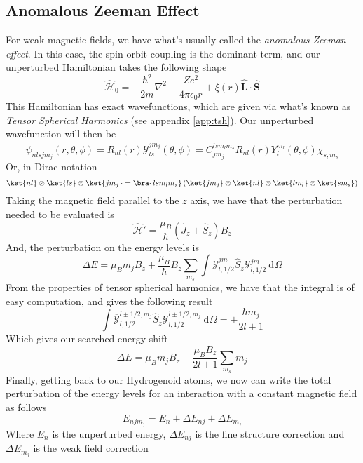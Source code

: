\documentclass[a4paper, 11pt]{book}
\renewcommand{\vec}[1]{\mathbf{#1}}
\newcommand{\1}{\opr{\mathds{1}}}
\newcommand{\diff}[2][]{\ \mathrm{d}^{#1}#2}
\newcommand{\ham}{\mathcal{H}}
\newcommand{\opr}[1]{\hat{#1}}
\newcommand{\cc}[1]{\overline{#1}}
\newcommand{\mc}[1]{\mathcal{#1}}
\newcommand{\vecopr}[1]{\opr{\vec{#1}}}
\theoremstyle{plain}
\begin{document}
	\subsection{Anomalous Zeeman Effect}
	For weak magnetic fields, we have what's usually called the \textit{anomalous Zeeman effect}. In this case, the spin-orbit coupling is the dominant term, and our unperturbed Hamiltonian takes the following shape
	\begin{equation}
		\opr{\ham}_0=-\frac{\hbar^2}{2m}\nabla^2-\frac{Ze^2}{4\pi\epsilon_0r}+\xi(r)\vecopr{L}\cdot\vecopr{S}
		\label{eq:spinorbitham}
	\end{equation}
	This Hamiltonian has exact wavefunctions, which are given via what's known as \textit{Tensor Spherical Harmonics} (see appendix \ref{app:tsh}). Our unperturbed wavefunction will then be
	\begin{equation}
		\psi_{nlsjm_j}(r,\theta,\phi)=R_{nl}(r)\mc{Y}^{jm_j}_{ls}(\theta,\phi)=C_{jm_j}^{lsm_lm_s}R_{nl}(r)Y^{m_l}_l(\theta,\phi)\chi_{s,m_s}
		\label{eq:wavefunctionspinorbit}
	\end{equation}
	Or, in Dirac notation
	\begin{equation}
		\ket{nl}\otimes\ket{ls}\otimes\ket{jm_j}=\bra{lsm_lm_s}\left(\ket{jm_j}\otimes\ket{nl}\otimes\ket{lm_l}\otimes\ket{sm_s}\right)
		\label{eq:spinorbitautoket}
	\end{equation}
	Taking the magnetic field parallel to the $z$ axis, we have that the perturbation needed to be evaluated is
	\begin{equation}
		\opr{\ham}'=\frac{\mu_B}{\hbar}\left( \opr{J}_z+\opr{S}_z \right)B_z
		\label{eq:perturbationweakfield}
	\end{equation}
	And, the perturbation on the energy levels is
	\begin{equation}
		\Delta E=\mu_Bm_jB_z+\frac{\mu_B}{\hbar}B_z\sum_{m_s}\int\cc{\mc{Y}}^{jm}_{l,1/2}\opr{S}_z\mc{Y}^{jm}_{l,1/2}\diff{\Omega}
		\label{eq:energyshiftweakfield}
	\end{equation}
	From the properties of tensor spherical harmonics, we have that the integral is of easy computation, and gives the following result
	\begin{equation}
		\int\cc{\mc{Y}}^{l\pm1/2,m_j}_{l,1/2}\opr{S}_z\mc{Y}^{l\pm1/2,m_j}_{l,1/2}\diff{\Omega}=\pm\frac{\hbar m_j}{2l+1}
		\label{eq:integralcomputationweakf}
	\end{equation}
	Which gives our searched energy shift
	\begin{equation}
		\Delta E=\mu_Bm_jB_z+\frac{\mu_BB_z}{2l+1}\sum_{m_s}m_j
		\label{eq:anomalouszeemanshift}
	\end{equation}
	Finally, getting back to our Hydrogenoid atoms, we now can write the total perturbation of the energy levels for an interaction with a constant magnetic field as follows
	\begin{equation}
		E_{njm_j}=E_n+\Delta E_{nj}+\Delta E_{m_j}
		\label{eq:totalperthyatoms}
	\end{equation}
	Where $E_n$ is the unperturbed energy, $\Delta E_{nj}$ is the fine structure correction and $\Delta E_{m_j}$ is the weak field correction
\end{document}
